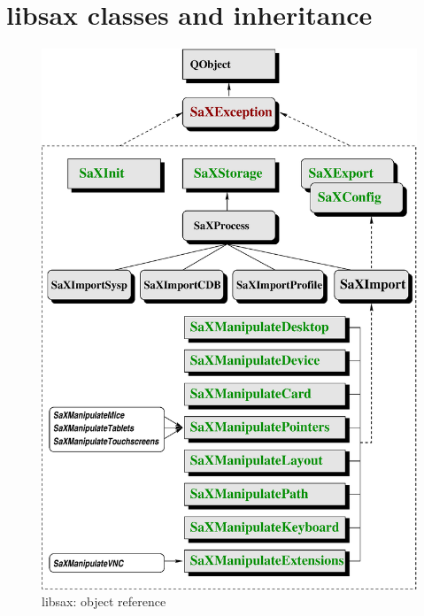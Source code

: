 \section{libsax classes and inheritance}
\begin{figure}[h]
\caption{libsax: object reference}
\vspace*{0.1cm}
\includegraphics[scale=0.5]{figures/tree.eps}
\end{figure}
